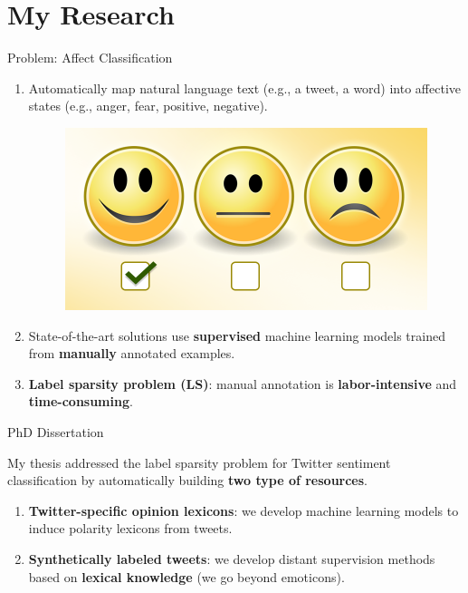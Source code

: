 \documentclass[handout]{beamer}
\begin{document}
\section{My Research}






\begin{frame}{Problem: Affect Classification}
\begin{scriptsize}
  \begin{enumerate}
   \item Automatically map natural language text (e.g., a tweet, a word) into affective states (e.g., anger, fear, positive, negative).
   
     \begin{figure}[h]
        	\includegraphics[scale = 0.15]{pics/sent.png}
        \end{figure}
   \item State-of-the-art solutions use \textbf{supervised} machine learning models trained from \textbf{manually} annotated examples.
   \item \textbf{Label sparsity problem (LS)}: manual annotation is \textbf{labor-intensive} and \textbf{time-consuming}. 
  \end{enumerate} 
\end{scriptsize}

\end{frame}



\begin{frame}{PhD Dissertation}

My thesis addressed the label sparsity problem for Twitter sentiment classification by automatically building \textbf{two type of resources}. 
\begin{enumerate}
 \item \textbf{Twitter-specific opinion lexicons}: we develop machine learning models to induce polarity lexicons from tweets. 
 \item  \textbf{Synthetically labeled tweets}: we develop distant supervision methods based on \textbf{lexical knowledge} (we go beyond emoticons). 
 \end{enumerate}

\end{frame}
\end{document}
